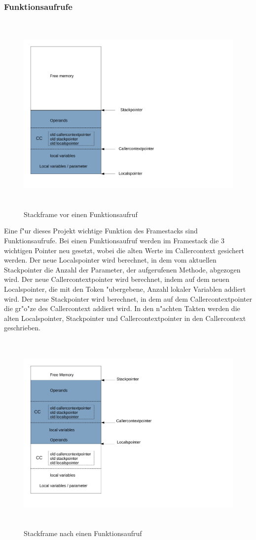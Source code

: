 \subsubsection{Funktionsaufrufe}
\begin{figure}[H]
	\centering
	\includegraphics[height = 10cm]{PS_RS_graphics/StackframebeforeInvoke.pdf}
	\caption{Stackframe vor einen Funktionsaufruf}
\end{figure}
Eine f"ur dieses Projekt wichtige Funktion des Framestacks sind Funktionsaufrufe. Bei einen Funktionsaufruf werden im Framestack die 3 wichtigen Pointer neu gesetzt, wobei die alten Werte im Callercontext gesichert werden. Der neue Localspointer wird berechnet, in dem vom aktuellen Stackpointer die Anzahl der Parameter, der aufgerufenen Methode, abgezogen wird. Der neue Callercontextpointer wird berechnet, indem auf dem neuen Localspointer, die mit den Token "ubergebene, Anzahl lokaler Variablen addiert wird. Der neue Stackpointer wird berechnet, in dem auf dem Callercontextpointer die gr"o"ze des Callercontext addiert wird. 
In den n"achten Takten werden die alten Localspointer, Stackpointer und Callercontextpointer in den Callercontext geschrieben. \cite{Illy}
\begin{figure}[H]
	\centering
	\includegraphics[height = 10cm]{PS_RS_graphics/StackframeafterInvoke.pdf}
	\caption{Stackframe nach einen Funktionsaufruf}
\end{figure}


